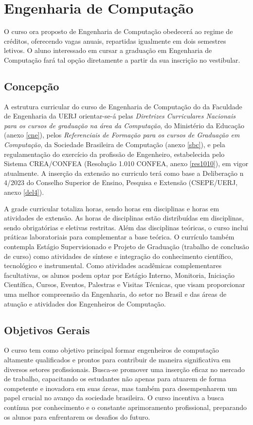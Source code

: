 
\chapter{Engenharia de Computação}
O curso ora proposto de Engenharia de Computação obedecerá ao regime de créditos, oferecendo \vagas vagas anuais, repartidas igualmente em dois semestres letivos. O aluno interessado em cursar a graduação em Engenharia de Computação fará tal opção diretamente a partir da sua inscrição no vestibular.

\section{Concepção}

A estrutura curricular do curso de Engenharia de Computação do \desc da Faculdade de Engenharia da UERJ orientar-se-á pelas \textit{Diretrizes Curriculares Nacionais para os cursos de graduação na área da Computação}, do Ministério da Educação (anexo \ref{cne}), pelos \textit{Referenciais de Formação para os cursos de Graduação em Computação}, da Sociedade Brasileira de Computação (anexo \ref{sbc}), e pela regulamentação do exercício da profissão de Engenheiro, estabelecida pelo Sistema CREA/CONFEA (Resolução 1.010 CONFEA, anexo \ref{res1010}), em vigor atualmente. A inserção da extensão no curriculo terá como base a Deliberação n\textordmasculine{} 4/2023 do Conselho Superior de Ensino, Pesquisa e Extensão (CSEPE/UERJ, anexo \ref{del4}).

A grade curricular totaliza \totalhoras horas, sendo \hobrigatorias horas em disciplinas e \hextensao horas em atividades de extensão. As \hobrigatorias horas de disciplinas estão distribuídas em \ndisciplinas disciplinas, sendo \nobrigatorias  obrigatórias e \neletivas eletivas restritas. Além das disciplinas teóricas, o curso inclui práticas laboratoriais para complementar a base teórica. O currículo também contempla Estágio Supervisionado e Projeto de Graduação (trabalho de conclusão de curso) como atividades de síntese e integração do conhecimento científico, tecnológico e instrumental. Como atividades acadêmicas complementares facultativas, os alunos podem optar por Estágio Interno, Monitoria, Iniciação Científica, Cursos, Eventos, Palestras e Visitas Técnicas, que visam proporcionar uma melhor compreensão da Engenharia, do setor no Brasil e das áreas de atuação e atividades dos Engenheiros de Computação.

\section{Objetivos Gerais}
O curso tem como objetivo principal formar engenheiros de computação altamente qualificados e prontos para contribuir de maneira significativa em diversos setores profissionais. Busca-se promover uma inserção eficaz no mercado de trabalho, capacitando os estudantes não apenas para atuarem de forma competente e inovadora em suas áreas, mas também para desempenharem um papel crucial no avanço da sociedade brasileira. O curso incentiva a busca contínua por conhecimento e o constante aprimoramento profissional, preparando os alunos para enfrentarem os desafios do futuro.

